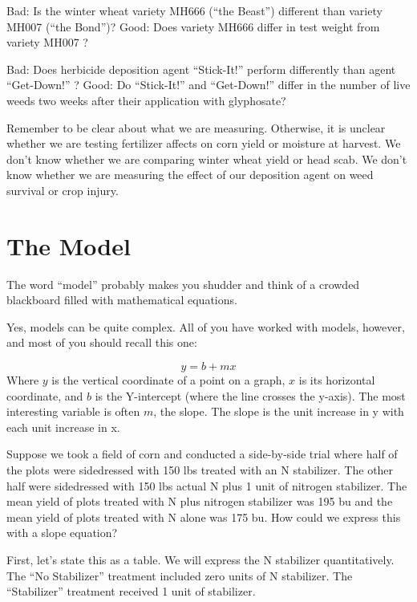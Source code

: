 \documentclass[
]{book}
\begin{document}
Bad: Is the winter wheat variety MH666 (``the Beast'') different than variety MH007 (``the Bond'')?
Good: Does variety MH666 differ in test weight from variety MH007 ?

Bad: Does herbicide deposition agent ``Stick-It!'' perform differently than agent ``Get-Down!'' ?
Good: Do ``Stick-It!'' and ``Get-Down!'' differ in the number of live weeds two weeks after their application with glyphosate?

Remember to be clear about what we are measuring. Otherwise, it is unclear whether we are testing fertilizer affects on corn yield or moisture at harvest. We don't know whether we are comparing winter wheat yield or head scab. We don't know whether we are measuring the effect of our deposition agent on weed survival or crop injury.

\hypertarget{the-model}{%
\section{The Model}\label{the-model}}

The word ``model'' probably makes you shudder and think of a crowded blackboard filled with mathematical equations.

Yes, models can be quite complex. All of you have worked with models, however, and most of you should recall this one:

\[ y = b + mx  \]
Where \(y\) is the vertical coordinate of a point on a graph, \(x\) is its horizontal coordinate, and \(b\) is the Y-intercept (where the line crosses the y-axis). The most interesting variable is often \(m\), the slope. The slope is the unit increase in y with each unit increase in x.

Suppose we took a field of corn and conducted a side-by-side trial where half of the plots were sidedressed with 150 lbs treated with an N stabilizer. The other half were sidedressed with 150 lbs actual N plus 1 unit of nitrogen stabilizer. The mean yield of plots treated with N plus nitrogen stabilizer was 195 bu and the mean yield of plots treated with N alone was 175 bu. How could we express this with a slope equation?

First, let's state this as a table. We will express the N stabilizer quantitatively. The ``No Stabilizer'' treatment included zero units of N stabilizer. The ``Stabilizer'' treatment received 1 unit of stabilizer.
\end{document}
